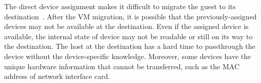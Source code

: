 The direct device assignment makes it difficult to migrate the
guest to its destination~\cite{zhai:2008}. After the VM
migration, it is possible that the previously-assigned devices
may not be available at the destination. Even if the assigned
device is available, the internal state of device may not be
readable or still on its way to the destination. The host at
the destination has a hard time to passthrough the device
without the device-specific knowledge. Moreover, some devices
have the unique hardware information that cannot be
transferred, such as the MAC address of network interface
card.

